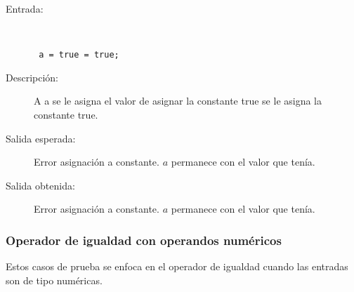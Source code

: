 	\begin{description}
		\item [Entrada:] \hfill \\
\begin{lstlisting}
 a = true = true;
\end{lstlisting}
		\item [Descripción:] A a se le asigna el valor de asignar la constante true se le asigna la constante true.
		\item [Salida esperada:] Error asignación a constante. $a$ permanece con el valor que tenía.
		\item [Salida obtenida:] Error asignación a constante. $a$ permanece con el valor que tenía.
	\end{description}


\subsubsection{Operador de igualdad con operandos numéricos}
Estos casos de prueba se enfoca en el operador de igualdad cuando las entradas son de tipo numéricas.

